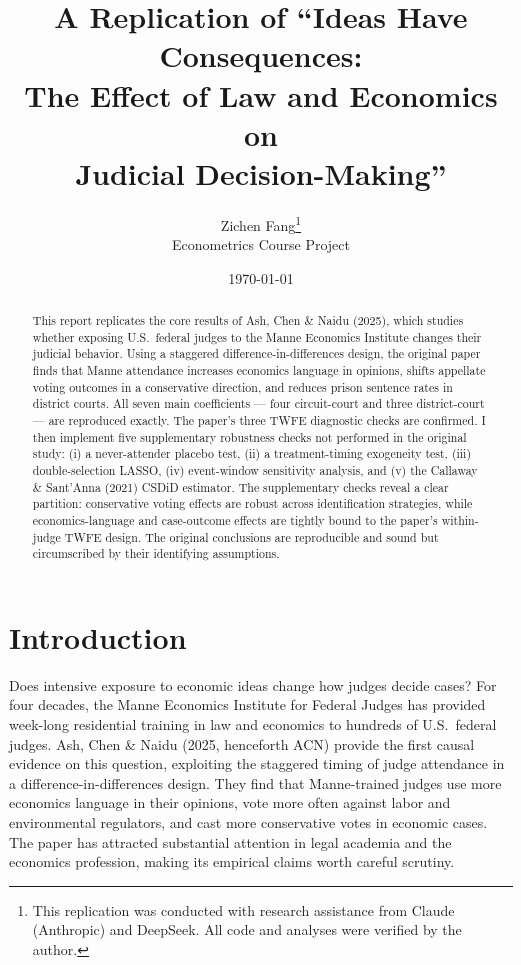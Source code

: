 \documentclass[12pt,a4paper]{article}
\title{A Replication of ``Ideas Have Consequences: \\
The Effect of Law and Economics on \\
Judicial Decision-Making''}
\author{Zichen Fang\thanks{This replication was conducted with research assistance from Claude (Anthropic) and DeepSeek. All code and analyses were verified by the author.} \\[0.5em]
\small Econometrics Course Project}
\date{\today}
\begin{document}
\maketitle

\begin{abstract}
This report replicates the core results of Ash, Chen \& Naidu (2025), which studies whether exposing U.S.\ federal judges to the Manne Economics Institute changes their judicial behavior. Using a staggered difference-in-differences design, the original paper finds that Manne attendance increases economics language in opinions, shifts appellate voting outcomes in a conservative direction, and reduces prison sentence rates in district courts. All seven main coefficients --- four circuit-court and three district-court --- are reproduced exactly. The paper's three TWFE diagnostic checks are confirmed. I then implement five supplementary robustness checks not performed in the original study: (i) a never-attender placebo test, (ii) a treatment-timing exogeneity test, (iii) double-selection LASSO, (iv) event-window sensitivity analysis, and (v) the Callaway \& Sant'Anna (2021) CSDiD estimator. The supplementary checks reveal a clear partition: conservative voting effects are robust across identification strategies, while economics-language and case-outcome effects are tightly bound to the paper's within-judge TWFE design. The original conclusions are reproducible and sound but circumscribed by their identifying assumptions.
\end{abstract}

\section{Introduction}
\label{sec:intro}

Does intensive exposure to economic ideas change how judges decide cases? For four decades, the Manne Economics Institute for Federal Judges has provided week-long residential training in law and economics to hundreds of U.S.\ federal judges. Ash, Chen \& Naidu (2025, henceforth ACN) provide the first causal evidence on this question, exploiting the staggered timing of judge attendance in a difference-in-differences design. They find that Manne-trained judges use more economics language in their opinions, vote more often against labor and environmental regulators, and cast more conservative votes in economic cases. The paper has attracted substantial attention in legal academia and the economics profession, making its empirical claims worth careful scrutiny.
\end{document}
